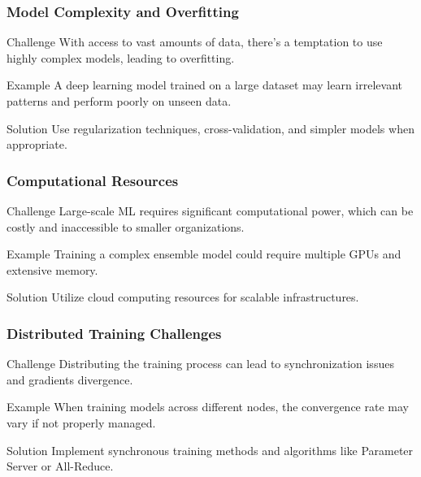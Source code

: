 \documentclass[aspectratio=169]{beamer}
\begin{document}
\begin{frame}[fragile]
    \frametitle{Model Complexity and Overfitting}
    \begin{block}{Challenge}
        With access to vast amounts of data, there’s a temptation to use highly complex models, leading to overfitting.
    \end{block}
    \begin{block}{Example}
        A deep learning model trained on a large dataset may learn irrelevant patterns and perform poorly on unseen data.
    \end{block}
    \begin{block}{Solution}
        Use regularization techniques, cross-validation, and simpler models when appropriate.
    \end{block}
\end{frame}

\begin{frame}[fragile]
    \frametitle{Computational Resources}
    \begin{block}{Challenge}
        Large-scale ML requires significant computational power, which can be costly and inaccessible to smaller organizations.
    \end{block}
    \begin{block}{Example}
        Training a complex ensemble model could require multiple GPUs and extensive memory.
    \end{block}
    \begin{block}{Solution}
        Utilize cloud computing resources for scalable infrastructures.
    \end{block}
\end{frame}

\begin{frame}[fragile]
    \frametitle{Distributed Training Challenges}
    \begin{block}{Challenge}
        Distributing the training process can lead to synchronization issues and gradients divergence.
    \end{block}
    \begin{block}{Example}
        When training models across different nodes, the convergence rate may vary if not properly managed.
    \end{block}
    \begin{block}{Solution}
        Implement synchronous training methods and algorithms like Parameter Server or All-Reduce.
    \end{block}
\end{frame}
\end{document}
